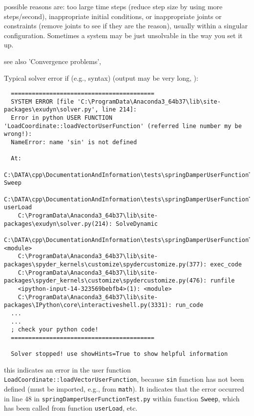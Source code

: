 \item[$\ra$] possible reasons are: too large time steps (reduce step size by using more steps/second), inappropriate initial conditions, or inappropriate joints or constraints (remove joints to see if they are the reason), usually within a singular configuration. Sometimes a system may be just unsolvable in the way you set it up.
\item[$\ra$] see also 'Convergence problems', 
\ei
\item Typical solver error if (e.g., syntax)  (output may be very long, ):
\begin{lstlisting}
  =========================================
  SYSTEM ERROR [file 'C:\ProgramData\Anaconda3_64b37\lib\site-packages\exudyn\solver.py', line 214]: 
  Error in python USER FUNCTION 'LoadCoordinate::loadVectorUserFunction' (referred line number my be wrong!):
  NameError: name 'sin' is not defined

  At:
    C:\DATA\cpp\DocumentationAndInformation\tests\springDamperUserFunctionTest.py(48): Sweep
    C:\DATA\cpp\DocumentationAndInformation\tests\springDamperUserFunctionTest.py(54): userLoad
    C:\ProgramData\Anaconda3_64b37\lib\site-packages\exudyn\solver.py(214): SolveDynamic
    C:\DATA\cpp\DocumentationAndInformation\tests\springDamperUserFunctionTest.py(106): <module>
    C:\ProgramData\Anaconda3_64b37\lib\site-packages\spyder_kernels\customize\spydercustomize.py(377): exec_code
    C:\ProgramData\Anaconda3_64b37\lib\site-packages\spyder_kernels\customize\spydercustomize.py(476): runfile
    <ipython-input-14-323569bebfb4>(1): <module>
    C:\ProgramData\Anaconda3_64b37\lib\site-packages\IPython\core\interactiveshell.py(3331): run_code
  ...
  ...
  ; check your python code!
  =========================================

  Solver stopped! use showHints=True to show helpful information
\end{lstlisting}
%
\bi
\item[$\ra$] this indicates an error in the user function \texttt{LoadCoordinate::loadVectorUserFunction}, because \texttt{sin} function has not been defined (must be imported, e.g., from \texttt{math}). It indicates that the error occurred in line 48 in \texttt{springDamperUserFunctionTest.py} within function \texttt{Sweep}, which has been called from function \texttt{userLoad}, etc.
